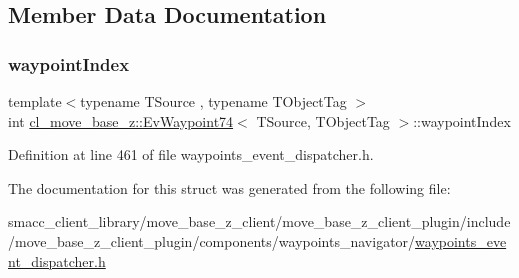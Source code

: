 \subsection{Member Data Documentation}
\mbox{\label{structcl__move__base__z_1_1EvWaypoint74_a4dff01b1eda8120ae654f9694bb8b3f2}} 
\subsubsection{\texorpdfstring{waypoint\+Index}{waypointIndex}}
{\footnotesize\ttfamily template$<$typename T\+Source , typename T\+Object\+Tag $>$ \\
int \hyperlink{structcl__move__base__z_1_1EvWaypoint74}{cl\+\_\+move\+\_\+base\+\_\+z\+::\+Ev\+Waypoint74}$<$ T\+Source, T\+Object\+Tag $>$\+::waypoint\+Index}



Definition at line 461 of file waypoints\+\_\+event\+\_\+dispatcher.\+h.



The documentation for this struct was generated from the following file\+:\begin{DoxyCompactItemize}
\item 
smacc\+\_\+client\+\_\+library/move\+\_\+base\+\_\+z\+\_\+client/move\+\_\+base\+\_\+z\+\_\+client\+\_\+plugin/include/move\+\_\+base\+\_\+z\+\_\+client\+\_\+plugin/components/waypoints\+\_\+navigator/\hyperlink{waypoints__event__dispatcher_8h}{waypoints\+\_\+event\+\_\+dispatcher.\+h}\end{DoxyCompactItemize}
